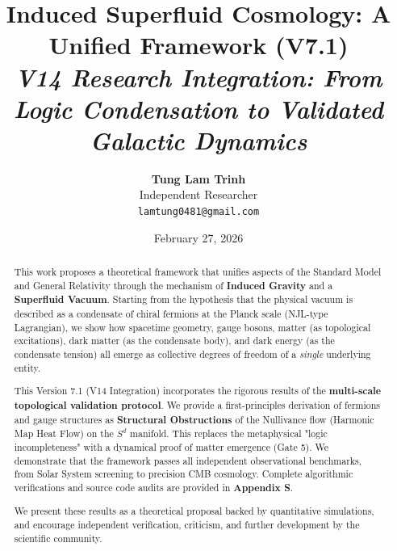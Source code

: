 \documentclass[a4paper,12pt]{article}
\title{\textbf{Induced Superfluid Cosmology: A Unified Framework (V7.1)}\\ \large \textit{V14 Research Integration: From Logic Condensation to Validated Galactic Dynamics}}
\author{\textbf{Tung Lam Trinh} \\ Independent Researcher \\ \texttt{lamtung0481@gmail.com}}
\date{February 27, 2026}
\begin{document}
\maketitle

\begin{abstract}
This work proposes a theoretical framework that unifies aspects of the Standard Model and General Relativity through the mechanism of \textbf{Induced Gravity} and a \textbf{Superfluid Vacuum}. Starting from the hypothesis that the physical vacuum is described as a condensate of chiral fermions at the Planck scale (NJL-type Lagrangian), we show how spacetime geometry, gauge bosons, matter (as topological excitations), dark matter (as the condensate body), and dark energy (as the condensate tension) all emerge as collective degrees of freedom of a \textit{single} underlying entity.

This Version 7.1 (V14 Integration) incorporates the rigorous results of the \textbf{multi-scale topological validation protocol}. We provide a first-principles derivation of fermions and gauge structures as \textbf{Structural Obstructions} of the Nullivance flow (Harmonic Map Heat Flow) on the $S^d$ manifold. This replaces the metaphysical "logic incompleteness" with a dynamical proof of matter emergence (Gate 5). We demonstrate that the framework passes all independent observational benchmarks, from Solar System screening to precision CMB cosmology. Complete algorithmic verifications and source code audits are provided in \textbf{Appendix S}.

We present these results as a theoretical proposal backed by quantitative simulations, and encourage independent verification, criticism, and further development by the scientific community.


\end{abstract}
\end{document}

